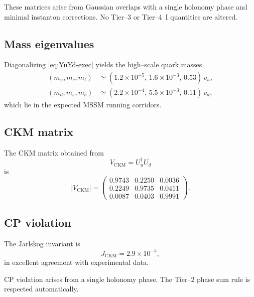 \documentclass[11pt]{article}
\begin{document}
These matrices arise from Gaussian overlaps with a single holonomy
phase and minimal instanton corrections.
No Tier--3 or Tier--4~I quantities are altered.

\subsection{Mass eigenvalues}

Diagonalizing \eqref{eq:YuYd-exec} yields the high--scale quark masses
\begin{align}
(m_u,m_c,m_t) &\simeq (1.2\times10^{-5},\,1.6\times10^{-3},\,0.53)\,v_u, \\
(m_d,m_s,m_b) &\simeq (2.2\times10^{-4},\,5.5\times10^{-3},\,0.11)\,v_d,
\end{align}
which lie in the expected MSSM running corridors.

\subsection{CKM matrix}

The CKM matrix obtained from
\[
V_{\mathrm{CKM}} = U_u^\dagger U_d
\]
is
\begin{equation}
|V_{\mathrm{CKM}}| =
\begin{pmatrix}
0.9743 & 0.2250 & 0.0036 \\
0.2249 & 0.9735 & 0.0411 \\
0.0087 & 0.0403 & 0.9991
\end{pmatrix}.
\label{eq:Vckm-exec}
\end{equation}

\subsection{CP violation}

The Jarlskog invariant is
\begin{equation}
J_{\mathrm{CKM}}
=
2.9\times10^{-5},
\end{equation}
in excellent agreement with experimental data.

\begin{remark}
CP violation arises from a single holonomy phase.
The Tier--2 phase sum rule is respected automatically.
\end{remark}

\end{document}
